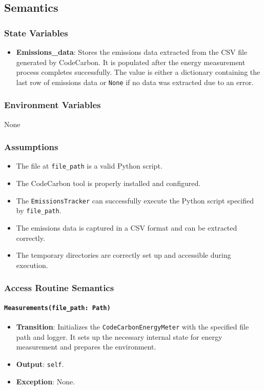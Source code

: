 \documentclass[12pt, titlepage]{article}
\begin{document}
\subsection{Semantics}

\subsubsection{State Variables}

\begin{itemize}
    \item \textbf{Emissions\_data}: Stores the emissions data extracted from the CSV file generated by CodeCarbon. It is populated after the energy measurement process completes successfully. The value is either a dictionary containing the last row of emissions data or \texttt{None} if no data was extracted due to an error.

\end{itemize}

\subsubsection{Environment Variables}
None


\subsubsection{Assumptions}

\begin{itemize}
  \item The file at \texttt{file\_path} is a valid Python script.
  \item The CodeCarbon tool is properly installed and configured.
  \item The \texttt{EmissionsTracker} can successfully execute the Python script specified by \texttt{file\_path}.
  \item The emissions data is captured in a CSV format and can be extracted correctly.
  \item The temporary directories are correctly set up and accessible during execution.
\end{itemize}

\subsubsection{Access Routine Semantics}
\paragraph{\texttt{Measurements(file\_path: Path)}}
\begin{itemize}
  \item \textbf{Transition}: Initializes the \texttt{CodeCarbonEnergyMeter} with the specified file path and logger. It sets up the necessary internal state for energy measurement and prepares the environment.
  \item \textbf{Output}: \texttt{self}.
  \item \textbf{Exception}: None.
\end{itemize}
\end{document}
